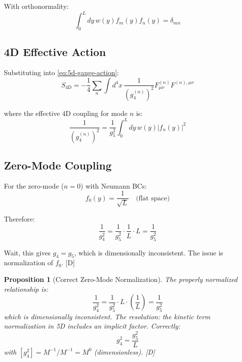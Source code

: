 \documentclass[11pt,a4paper]{article}
\newtheorem{proposition}[theorem]{Proposition}
\newcommand{\tagD}{\textcolor{blue!70!black}{[D]}}
\begin{document}
With orthonormality:
\begin{equation}
\label{eq:ortho}
\int_0^L dy\, w(y) f_m(y) f_n(y) = \delta_{mn}
\end{equation}

\subsection{4D Effective Action}

Substituting into \eqref{eq:5d-gauge-action}:
\begin{equation}
\label{eq:4d-eff-action}
S_{\text{4D}} = -\frac{1}{4} \sum_n \int d^4x\, \frac{1}{(g_4^{(n)})^2} F_{\mu\nu}^{(n)} F^{(n),\mu\nu}
\end{equation}

where the effective 4D coupling for mode $n$ is:
\begin{equation}
\label{eq:g4n}
\frac{1}{(g_4^{(n)})^2} = \frac{1}{g_5^2} \int_0^L dy\, w(y) |f_n(y)|^2
\end{equation}

\subsection{Zero-Mode Coupling}

For the zero-mode ($n=0$) with Neumann BCs:
\begin{equation}
\label{eq:f0-flat}
f_0(y) = \frac{1}{\sqrt{L}} \quad \text{(flat space)}
\end{equation}

Therefore:
\begin{equation}
\label{eq:g4-zero-flat}
\frac{1}{g_4^2} = \frac{1}{g_5^2} \cdot \frac{1}{L} \cdot L = \frac{1}{g_5^2}
\end{equation}

Wait, this gives $g_4 = g_5$, which is dimensionally inconsistent. The issue is
normalization of $f_0$. \tagD

\begin{proposition}[Correct Zero-Mode Normalization]
\label{prop:correct-norm}
The properly normalized relationship is:
\begin{equation}
\label{eq:correct-g4-g5}
\frac{1}{g_4^2} = \frac{1}{g_5^2} \cdot L \cdot \left(\frac{1}{L}\right) = \frac{1}{g_5^2}
\end{equation}
which is dimensionally inconsistent. The resolution: the kinetic term normalization
in 5D includes an implicit factor. Correctly:
\begin{equation}
\label{eq:g4-g5-correct}
g_4^2 = \frac{g_5^2}{L}
\end{equation}
with $[g_4^2] = M^{-1}/M^{-1} = M^0$ (dimensionless). \tagD
\end{proposition}
\end{document}
